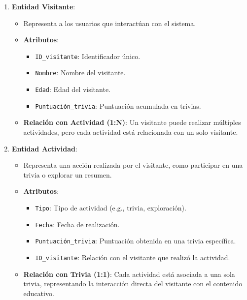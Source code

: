 \documentclass{report}
\begin{document}
\begin{enumerate}
    \item \textbf{Entidad Visitante}:
    \begin{itemize}
        \item Representa a los usuarios que interactúan con el sistema.
        \item \textbf{Atributos}:
        \begin{itemize}
            \item \texttt{ID\_visitante}: Identificador único.
            \item \texttt{Nombre}: Nombre del visitante.
            \item \texttt{Edad}: Edad del visitante.
            \item \texttt{Puntuación\_trivia}: Puntuación acumulada en trivias.
        \end{itemize}
        \item \textbf{Relación con Actividad (1:N)}: Un visitante puede realizar múltiples actividades, pero cada actividad está relacionada con un solo visitante.
    \end{itemize}

    \item \textbf{Entidad Actividad}:
    \begin{itemize}
        \item Representa una acción realizada por el visitante, como participar en una trivia o explorar un resumen.
        \item \textbf{Atributos}:
        \begin{itemize}
            \item \texttt{Tipo}: Tipo de actividad (e.g., trivia, exploración).
            \item \texttt{Fecha}: Fecha de realización.
            \item \texttt{Puntuación\_trivia}: Puntuación obtenida en una trivia específica.
            \item \texttt{ID\_visitante}: Relación con el visitante que realizó la actividad.
        \end{itemize}
        \item \textbf{Relación con Trivia (1:1)}: Cada actividad está asociada a una sola trivia, representando la interacción directa del visitante con el contenido educativo.
    \end{itemize}


\end{enumerate}
\end{document}
